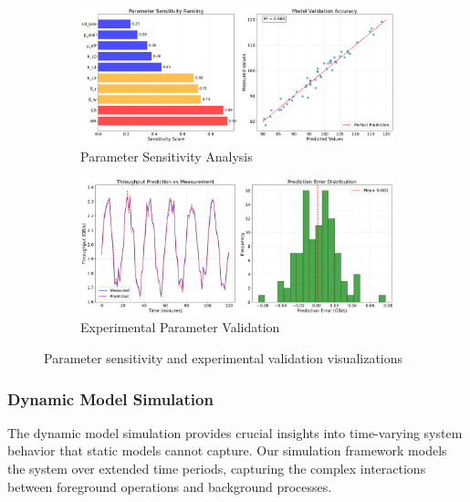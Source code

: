 \documentclass[11pt]{article}
\begin{document}
\begin{figure}[H]
\centering
\begin{subfigure}{0.48\textwidth}
\centering
\includegraphics[width=\textwidth]{experiments/2025-09-05/v3_parameter_sensitivity_analysis.png}
\caption{Parameter Sensitivity Analysis}
\label{fig:parameter_sensitivity}
\end{subfigure}
\hfill
\begin{subfigure}{0.48\textwidth}
\centering
\includegraphics[width=\textwidth]{experiments/2025-09-05/experimental_parameter_validation.png}
\caption{Experimental Parameter Validation}
\label{fig:experimental_validation}
\end{subfigure}
\caption{Parameter sensitivity and experimental validation visualizations}
\end{figure}

\subsubsection{Dynamic Model Simulation}
The dynamic model simulation provides crucial insights into time-varying system behavior that static models cannot capture. Our simulation framework models the system over extended time periods, capturing the complex interactions between foreground operations and background processes.
\end{document}
